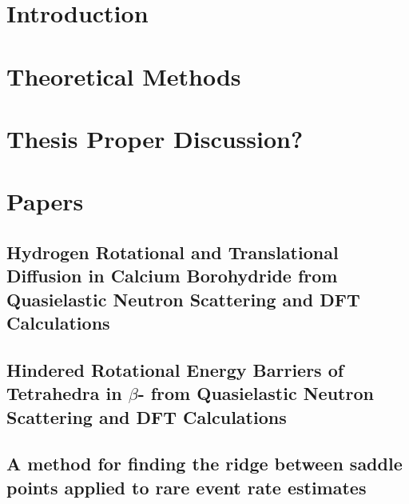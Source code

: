 \documentclass[oneside]{bThesis} %
\author{J\'on Bergmann Maronsson}
\title{\pending}
\begin{document}


\part{Introduction}
\label{part:introduction}

\part{Theoretical Methods}
\label{part:theory}

\part{Thesis Proper \pending Discussion?} 
\label{part:thesis}






\newpage
{}


\part{Papers}
\label{part:papers}
\appendix
\newcommand{\appchapter}[1]{\let\oldthechapter\thechapter
  \renewcommand{\thechapter}{Paper \oldthechapter}
    \chapter{#1}\let\thechapter\oldthechapter}

\appchapter{Hydrogen Rotational and Translational Diffusion in Calcium Borohydride from Quasielastic Neutron Scattering and DFT Calculations}
\label{pap:calcium}

%

\appchapter{Hindered Rotational Energy Barriers of  Tetrahedra in $\beta$-\ce{Mg(BH4)2} from Quasielastic Neutron Scattering and DFT Calculations}
\label{pap:magnesium}

%

\appchapter{A method for finding the ridge between saddle points applied to rare event rate estimates}
\label{pap:second-order}

%
\end{document}
